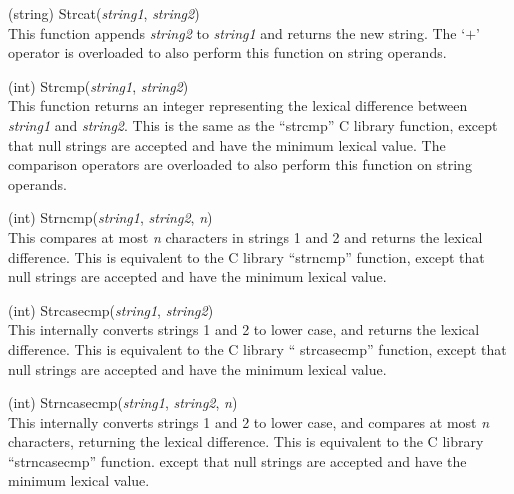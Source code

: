 \begin{description}
\item{(string) \vt Strcat({\it string1\/}, {\it string2\/})}\\
This function appends {\it string2\/} to {\it string1\/} and returns
the new string.  The `$+$' operator is overloaded to also perform this
function on string operands.

\item{(int) \vt Strcmp({\it string1\/}, {\it string2\/})}\\
This function returns an integer representing the lexical difference
between {\it string1} and {\it string2}.  This is the same as the
``{\vt strcmp}'' C library function, except that null strings are
accepted and have the minimum lexical value.  The comparison operators
are overloaded to also perform this function on string operands.

\item{(int) \vt Strncmp({\it string1\/}, {\it string2\/}, {\it n\/})}\\
This compares at most {\it n} characters in strings 1 and 2 and
returns the lexical difference.  This is equivalent to the C library
``{\vt strncmp}'' function, except that null strings are accepted and
have the minimum lexical value.

\item{(int) \vt Strcasecmp({\it string1\/}, {\it string2\/})}\\
This internally converts strings 1 and 2 to lower case, and returns
the lexical difference.  This is equivalent to the C library ``{\vt
strcasecmp}'' function, except that null strings are accepted and have
the minimum lexical value.

\item{(int) \vt Strncasecmp({\it string1\/}, {\it string2\/}, {\it n\/})}\\
This internally converts strings 1 and 2 to lower case, and compares
at most {\it n} characters, returning the lexical difference.  This is
equivalent to the C library ``{\vt strncasecmp}'' function.  except
that null strings are accepted and have the minimum lexical value.


\end{description}
